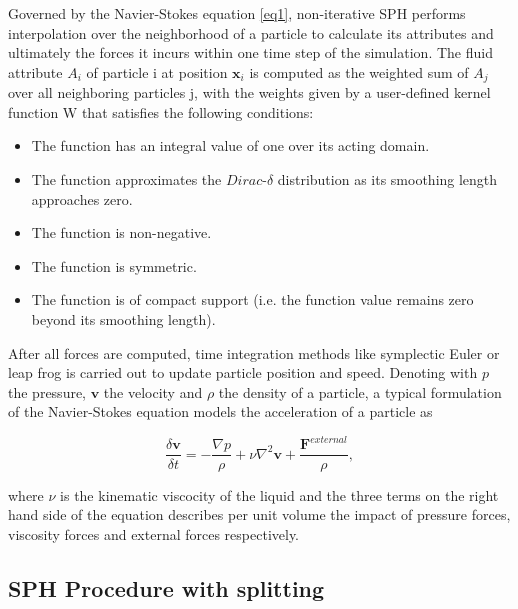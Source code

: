 Governed by the Navier-Stokes equation \eqref{eq1}, non-iterative SPH performs interpolation over the neighborhood of a particle to calculate its attributes and ultimately the forces it incurs within one time step of the simulation. The fluid attribute $ A_{i} $ of particle i at position $ \boldsymbol{x}_{i} $ is computed as the weighted sum of  $ A_{j} $ over all neighboring particles j, with the weights given by a user-defined kernel function W that satisfies the following conditions:

\begin{itemize}
    \item The function has an integral value of one over its acting domain.
    \item The function approximates the $ Dirac $-$ \delta $ distribution as its smoothing length approaches zero.
    \item The function is non-negative.
    \item The function is symmetric.
    \item The function is of compact support (i.e. the function value remains zero beyond its smoothing length).
\end{itemize}

After all forces are computed, time integration methods like symplectic Euler or leap frog is carried out to update particle position and speed. Denoting with $p$ the pressure, $\boldsymbol{v}$ the velocity and $\rho$ the density of a particle, a typical formulation of the Navier-Stokes equation models the acceleration of a particle as

\begin{equation}
	\label{eq1}
	\frac{\delta \boldsymbol{v}}{\delta t} = -\frac{\nabla p}{\rho} + \nu \nabla^{2} \boldsymbol{v} + \frac{\boldsymbol{F}^{external}}{\rho},
\end{equation}

where $ \nu $ is the kinematic viscocity of the liquid and the three terms on the right hand side of the equation describes per unit volume the impact of pressure forces, viscosity forces and external forces respectively. 

\subsection{SPH Procedure with splitting}

